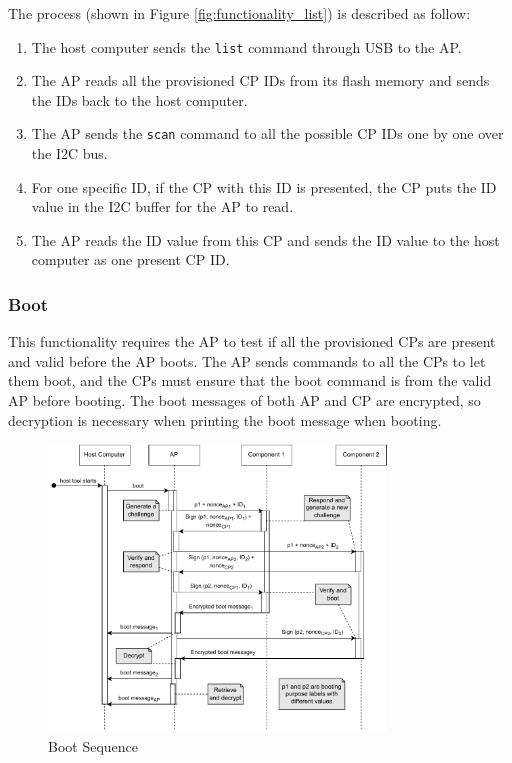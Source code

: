 \documentclass[11pt,oneside,onecolumn,letterpaper]{article}
\begin{document}
	The process (shown in Figure \ref{fig:functionality_list}) is described as follow:
	
	\begin{enumerate}
		\item The host computer sends the \texttt{list} command through USB to the AP.
		\item The AP reads all the provisioned CP IDs from its flash memory and sends the IDs back to the host computer.
		\item The AP sends the \texttt{scan} command to all the possible CP IDs one by one over the I2C bus.
		\item For one specific ID,
		if the CP with this ID is presented,
		the CP puts the ID value in the I2C buffer for the AP to read.
		\item The AP reads the ID value from this CP and sends the ID value to the host computer as one present CP ID.
		
	\end{enumerate}
	
	\subsubsection{Boot}
	This functionality requires the AP to test if all the provisioned CPs are present and valid before the AP boots.
	The AP sends commands to all the CPs to let them boot,
	and the CPs must ensure that the boot command is from the valid AP before booting.
	The boot messages of both AP and CP are encrypted,
	so decryption is necessary when printing the boot message when booting.
	
	\begin{figure}[h]
		\centering
		\includegraphics[width=0.8\textwidth]{pics/boot.pdf}
		\caption{Boot Sequence}
		\label{fig:functionality_boot}
	\end{figure}
	
\end{document}
